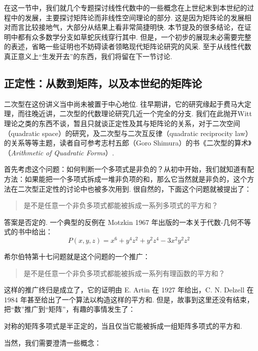 在这一节中，我们就几个专题探讨线性代数中的一些概念在上世纪末到本世纪的过程中的发展，主要探讨矩阵论而非线性空间理论的部分. 这是因为矩阵论的发展相对而言比较接地气，大部分从结果上看非常简捷明快. 本节提及的很多结论，在证明中都有众多数学分支如草蛇灰线穿行其中. 但是，一个初步的展现未必需要完整的表述，省略一些证明也不妨碍读者领略现代矩阵论研究的风采. 至于从线性代数真正意义上``生发开去''的东西，我们将留在下一节讨论.

\subsection{正定性：从数到矩阵，以及本世纪的矩阵论}

二次型在这份讲义当中尚未被置于中心地位. 往早期讲，它的研究缘起于费马大定理，而往晚近讲，二次型的代数理论研究几近一个完全的分支. 我们在此抛开Witt理论之类的东西不谈，暂且只就谈正定性及其与矩阵论的关系，对于二次空间（quadratic space）的研究，及二次型与二次互反律（quadratic reciprocity law）的关系等等主题，读者自可参考志村五郎（Goro Shimura）的书《二次型的算术》（\textit{Arithmetic of Quadratic Forms}）.

首先考虑这个问题：如何判断一个多项式是非负的？从初中开始，我们就知道有配方法：如果能把一个多项式拆成一堆非负项的和，那么它当然就是非负的，这个方法在二次型正定性的讨论中也被多次用到. 很自然的，下面这个问题就被提出了：

\begin{quote}
    \kaishu
    是不是任意一个非负多项式都能被拆成一系列多项式的平方和？
\end{quote}

答案是否定的. 一个典型的反例在 Motzkin 1967 年出版的一本关于代数-几何不等式的书中给出：
\[ P(x, y, z) = x^6 + y^4z^2 + y^2z^4 -3x^2y^2z^2 \]

希尔伯特第十七问题就是这个问题的一个推广：
\begin{quote}
    \kaishu
    是不是任意一个非负多项式都能被拆成一系列有理函数的平方和？
\end{quote}

这样的推广终归是成立了，它的证明由 E. Artin 在 1927 年给出，C. N. Delzell 在 1984 年甚至给出了一个算法以构造这样的平方和. 但是，故事到这里还没有结束，把``数''推广到``矩阵''，有趣的事情发生了：

\begin{theorem}[Helton, 2002]\label{thm:16:helton2002}
    对称的矩阵多项式是半正定的，当且仅当它能被拆成一组矩阵多项式的平方和.
\end{theorem}

当然，我们需要澄清一些概念：

